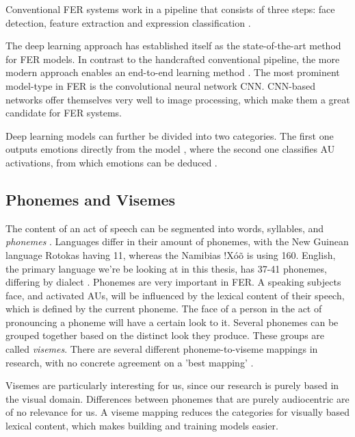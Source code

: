 Conventional FER systems work in a pipeline that consists of three steps: face detection, feature extraction and expression classification \cite{ko2018brief}.

The deep learning approach has established itself as the state-of-the-art method for FER models. In contrast to the handcrafted conventional pipeline, the more modern approach enables an end-to-end learning method \cite{ko2018brief}. The most prominent model-type in FER is the convolutional neural network CNN. CNN-based networks offer themselves very well to image processing, which make them a great candidate for FER systems. 

Deep learning models can further be divided into two categories. The first one outputs emotions directly from the model \cite{ebrahimi2015recurrent} \cite{kim2017multi} \cite{jung2015joint}, where the second one classifies AU activations, from which emotions can be deduced \cite{breuer2017deep} \cite{zhao2016deep} \cite{chu2017learning}. 

\subsection{Phonemes and Visemes}
The content of an act of speech can be segmented into words, syllables, and \emph{phonemes} \cite{savin1970nonperceptual}. Languages differ in their amount of phonemes, with the New Guinean language Rotokas having 11, whereas the Namibias !Xóõ is using 160. English, the primary language we're be looking at in this thesis, has 37-41 phonemes, differing by dialect \cite{Hayes2009}. Phonemes are very important in FER. A speaking subjects face, and activated AUs, will be influenced by the lexical content of their speech, which is defined by the current phoneme. The face of a person in the act of pronouncing a phoneme will have a certain look to it. Several phonemes can be grouped together based on the distinct look they produce. These groups are called \emph{visemes}. There are several different phoneme-to-viseme mappings in research, with no concrete agreement on a 'best mapping' \cite{cappelletta2012viseme}.

Visemes are particularly interesting for us, since our research is purely based in the visual domain. Differences between phonemes that are purely audiocentric are of no relevance for us. A viseme mapping reduces the categories for visually based lexical content, which makes building and training models easier.